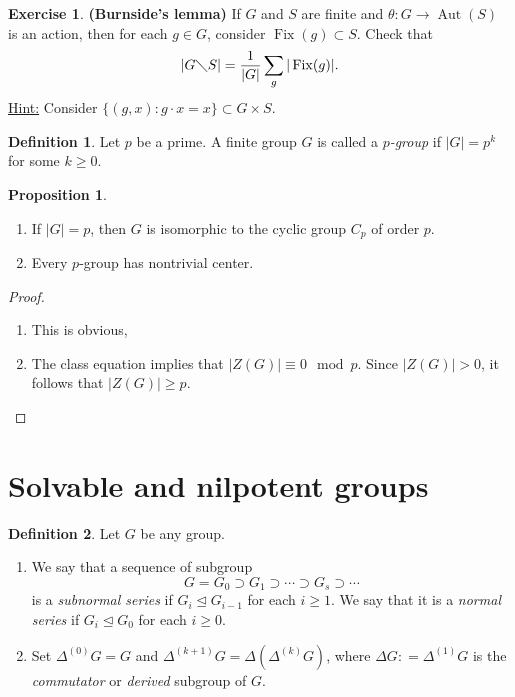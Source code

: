 \documentclass[10pt,letterpaper,cm]{nupset}
\theoremstyle{definition}
\newtheorem*{definition}{Definition}
\newtheorem{prop}{Proposition}
\newtheorem{exercise}{Exercise}
\newcommand{\1}{\mathbf{1}}
\newcommand{\0}{\vec 0}
\DeclareMathOperator{\aut}{Aut}
\DeclareMathOperator{\fix}{Fix}
\begin{document}
\begin{exercise}{\textbf{(Burnside's lemma)}} If $G$ and $S$ are finite and $\theta : G \to \aut(S)$ is an action, then for each $g\in G$, consider $\fix(g) \subset S$. Check that $$|G \diagdown S| = \frac{1}{|G|} \sum_g |\fix(g)|.$$ \underline{Hint:} Consider $\{(g,x): g \cdot x=x\} \subset G \times S$.
\end{exercise}
 
\begin{definition}
Let $p$ be a prime. A finite group $G$ is called a \textit{$p$-group} if $|G| = p^k$ for some $k \geq 0$. 
\end{definition}

\begin{prop}  $ $
\begin{enumerate}
\item If $|G| = p$, then $G$ is isomorphic to the cyclic group $C_p$ of order $p$.
\item Every $p$-group has nontrivial center.
\end{enumerate}
\end{prop}
\begin{proof} $ $
\begin{enumerate}
\item This is obvious,
\item The class equation implies that $|Z(G)| \equiv 0 \mod p$. Since $|Z(G)|>0$, it follows that $|Z(G)|\geq p$.
\end{enumerate}
\end{proof}

\section{Solvable and nilpotent groups}

\begin{definition} Let $G$ be any group.
\begin{enumerate}
\item We say that a sequence of subgroup $$  G= G_0 \supset G_1 \supset \cdots \supset G_s \supset \cdots    $$ is a \textit{subnormal series} if $G_i \unlhd G_{i-1}$ for each $i\geq 1$. We say that it is a \textit{normal series} if $G_i \unlhd G_0$ for each $i\geq 0$. 
\item Set $\Delta^{(0)}G =G$ and $\Delta^{(k+1)}G = \Delta(\Delta^{(k)}G)$, where $\Delta G: = \Delta^{(1)} G$ is the \textit{commutator} or \textit{derived} subgroup of $G$.
\end{enumerate}
\end{definition}
\end{document}
